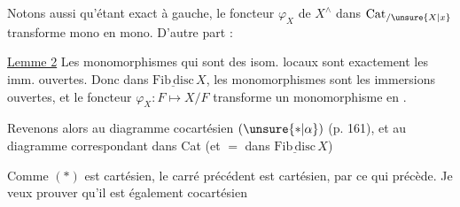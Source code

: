 
Notons aussi qu'étant exact à gauche, le foncteur $\varphi_X$ de $X^\wedge$ dans $\mathrm{Cat}_{/\unsure{X|x}}$ transforme mono en mono. D'autre part :

\uline{Lemme 2} Les monomorphismes qui sont des isom.  locaux sont exactement les imm. ouvertes. Donc  dans $\underline{\mathrm{Fib\,disc}}\,X$, les monomorphismes sont les immersions ouvertes, et le foncteur $\varphi_X\colon F\longmapsto X/F$ transforme un monomorphisme en .

Revenons alors au diagramme cocartésien $(\unsure{*|\alpha})$ (p. 161), et au diagramme correspondant dans Cat (et $=$ dans $\underline{\mathrm{Fib\,disc}}\,X$)


Comme $(*)$ est cartésien, le carré précédent est cartésien, par ce qui précède. Je veux prouver qu'il est également cocartésien
